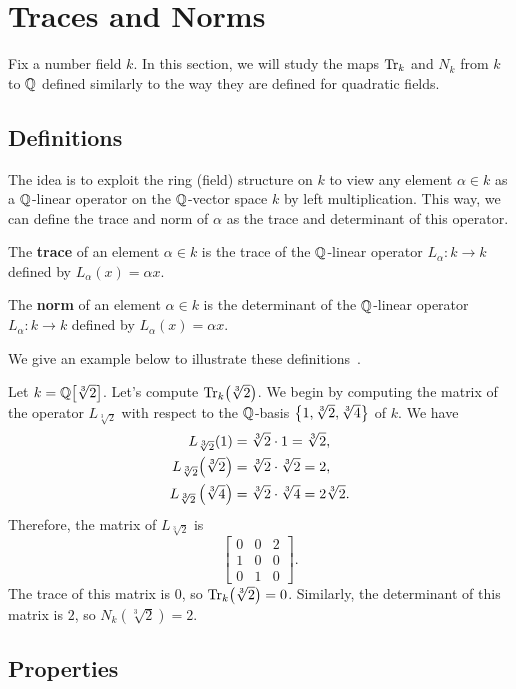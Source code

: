 \section{Traces and Norms}

Fix a number field $k$. In this section, we will study the maps $\operatorname{Tr}_k$ and $N_k$ from $k$ to $\mathbb{Q}$ defined similarly to the way they are defined for quadratic fields.

\subsection{Definitions}

The idea is to exploit the ring (field) structure on $k$ to view any element $\alpha \in k$ as a $\mathbb{Q}$-linear operator on the $\mathbb{Q}$-vector space $k$ by left multiplication. This way, we can define the trace and norm of $\alpha$ as the trace and determinant of this operator.

\begin{boxdefinition}[Trace]
    The \textbf{trace} of an element $\alpha \in k$ is the trace of the $\mathbb{Q}$-linear operator $L_\alpha : k \to k$ defined by $L_\alpha(x) = \alpha x$.
\end{boxdefinition}

\begin{boxdefinition}[Norm]
    The \textbf{norm} of an element $\alpha \in k$ is the determinant of the $\mathbb{Q}$-linear operator $L_\alpha : k \to k$ defined by $L_\alpha(x) = \alpha x$.
\end{boxdefinition}

We give an example below to illustrate these definitions~\cite[Example 3.8]{GeorgeBoxer}.

\begin{boxexample}
    Let $k = \mathbb{Q}\!\left[ \sqrt[3]{2} \right]$. Let's compute $\operatorname{Tr}_k\!\left( \sqrt[3]{2} \right)$. We begin by computing the matrix of the operator $L_{\sqrt[3]{2}}$ with respect to the $\mathbb{Q}$-basis $\left\{ 1, \sqrt[3]{2}, \sqrt[3]{4} \right\}$ of $k$. We have
    \begin{align*}
        L_{\sqrt[3]{2}}(1) &= \sqrt[3]{2} \cdot 1 = \sqrt[3]{2}, \\
        L_{\sqrt[3]{2}}\!\left( \sqrt[3]{2} \right) &= \sqrt[3]{2} \cdot \sqrt[3]{2} = 2, \\
        L_{\sqrt[3]{2}}\left( \sqrt[3]{4} \right) &= \sqrt[3]{2} \cdot \sqrt[3]{4} = 2\sqrt[3]{2}.
    \end{align*}
    Therefore, the matrix of $L_{\sqrt[3]{2}}$ is
    \begin{equation*}
        \begin{bmatrix}
            0 & 0 & 2 \\
            1 & 0 & 0 \\
            0 & 1 & 0
        \end{bmatrix}.
    \end{equation*}
    The trace of this matrix is $0$, so $\operatorname{Tr}_k\!\left( \sqrt[3]{2} \right) = 0$. Similarly, the determinant of this matrix is $2$, so $N_k(\sqrt[3]{2}) = 2$.
\end{boxexample}

\subsection{Properties}


